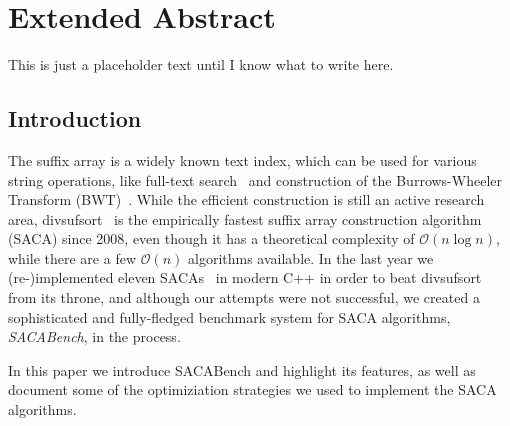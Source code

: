 \chapter{Extended Abstract}


This  is just a placeholder text until I know what to write here.

\section{Introduction}

The suffix array is a widely known text index, which can be used for various string operations, like full-text search~\cite{makinen} and construction of the Burrows-Wheeler Transform (BWT)~\cite{BWT}.
While the efficient construction is still an active research area,
divsufsort~\cite{saca:5,saca:5:repo} is the empirically fastest suffix array construction algorithm (SACA) since 2008,
even though it has a theoretical complexity of $\mathcal O (n \log n)$,
while there are a few $\mathcal O(n)$ algorithms available.
In the last year we (re-)implemented eleven SACAs~\cite{saca:3,saca:11,saca:5,saca:9,saca:1,saca:8,saca:4,saca:7,saca:10,saca:6,saca:2} in modern C++ in order to beat divsufsort from its throne,
and although our attempts were not successful,
we created a sophisticated and fully-fledged benchmark system for SACA algorithms, \emph{SACABench}, in the process.

In this paper we introduce SACABench and highlight its features,
as well as document some of the optimiziation strategies we used to implement the SACA algorithms.

